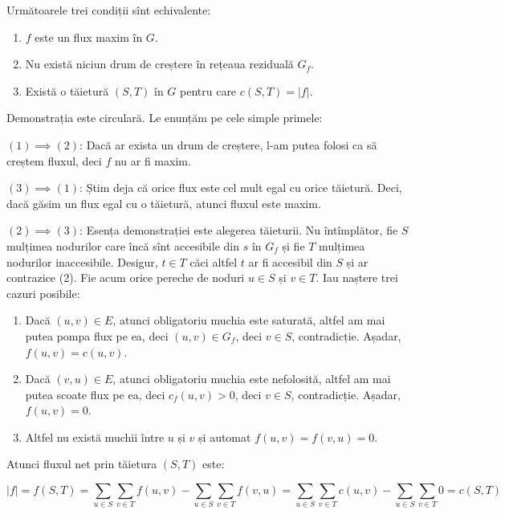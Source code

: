 \documentclass[../main.tex]{subfiles}
\begin{document}
\begin{theorem}
  Următoarele trei condiții sînt echivalente:

  \begin{enumerate}
    \item $f$ este un flux maxim în $G$.
    \item Nu există niciun drum de creștere în rețeaua reziduală $G_f$.
    \item Există o tăietură $(S,T)$ în $G$ pentru care $c(S, T) = |f|$.
  \end{enumerate}
\end{theorem}

Demonstrația este circulară. Le enunțăm pe cele simple primele:

$(1) \implies (2)$: Dacă ar exista un drum de creștere, l-am putea folosi ca să creștem fluxul, deci $f$ nu ar fi maxim.

$(3) \implies (1)$: Știm deja că orice flux este cel mult egal cu orice tăietură. Deci, dacă găsim un flux egal cu o tăietură, atunci fluxul este maxim.

$(2) \implies (3)$: Esența demonstrației este alegerea tăieturii. Nu întîmplător, fie $S$ mulțimea nodurilor care încă sînt accesibile din $s$ în $G_f$ și fie $T$ mulțimea nodurilor inaccesibile. Desigur, $t \in T$ căci altfel $t$ ar fi accesibil din $S$ și ar contrazice (2). Fie acum orice pereche de noduri $u \in S$ și $v \in T$. Iau naștere trei cazuri posibile:

\begin{enumerate}
  \item Dacă $(u, v) \in E$, atunci obligatoriu muchia este saturată, altfel am mai putea pompa flux pe ea, deci $(u, v) \in G_f$, deci $v \in S$, contradicție. Așadar, $f(u, v) = c(u, v)$.

  \item Dacă $(v, u) \in E$, atunci obligatoriu muchia este nefolosită, altfel am mai putea scoate flux pe ea, deci $c_f(u, v) > 0$, deci $v \in S$, contradicție. Așadar, $f(u, v) = 0$.

  \item Altfel nu există muchii între $u$ și $v$ și automat $f(u, v) = f(v, u) = 0$.
\end{enumerate}

Atunci fluxul net prin tăietura $(S,T)$ este:

$$|f| = f(S, T) = \sum_{u \in S} \sum_{v \in T} f(u, v) - \sum_{u \in S} \sum_{v \in T} f(v, u) = \sum_{u \in S} \sum_{v \in T} c(u, v) - \sum_{u \in S} \sum_{v \in T} 0 = c(S, T)$$
\end{document}
